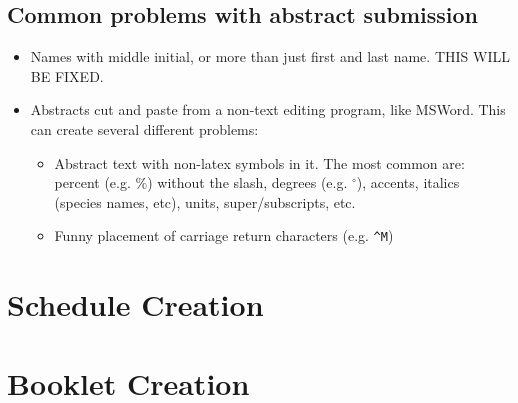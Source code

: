 \documentclass[letterpaper,12pt]{article}
\begin{document}
\subsection{Common problems with abstract submission}

\begin{itemize}
\item Names with middle initial, or more than just first and last
  name. THIS WILL BE FIXED.
\item Abstracts cut and paste from a non-text editing program, like
  MSWord. This can create several different problems:
  \begin{itemize}
  \item Abstract text with non-latex symbols in it. The most common
    are: percent (e.g. $\%$) without the slash, degrees
    (e.g. $^{\circ}$), accents, italics (species names, etc), units,
    super/subscripts, etc.
  \item Funny placement of carriage return characters (e.g. \verb|^M|)
  \end{itemize}

\end{itemize}

\section{Schedule Creation}

\section{Booklet Creation}
\end{document}
